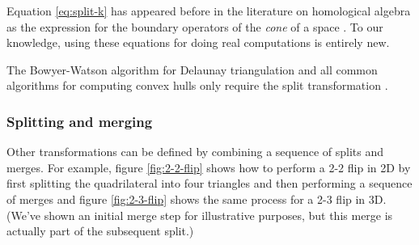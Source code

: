 \documentclass[twocolumn]{article}
\begin{document}
Equation \eqref{eq:split-k} has appeared before in the literature on homological algebra as the expression for the boundary operators of the \emph{cone} of a space \cite{gelfand1994homological}.
To our knowledge, using these equations for doing real computations is entirely new.

The Bowyer-Watson algorithm for Delaunay triangulation and all common algorithms for computing convex hulls only require the split transformation \cite{cheng2013delaunay}.

\subsubsection{Splitting and merging}

Other transformations can be defined by combining a sequence of splits and merges.
For example, figure \ref{fig:2-2-flip} shows how to perform a 2-2 flip in 2D by first splitting the quadrilateral into four triangles and then performing a sequence of merges and figure \ref{fig:2-3-flip} shows the same process for a 2-3 flip in 3D.
(We've shown an initial merge step for illustrative purposes, but this merge is actually part of the subsequent split.)
\end{document}
